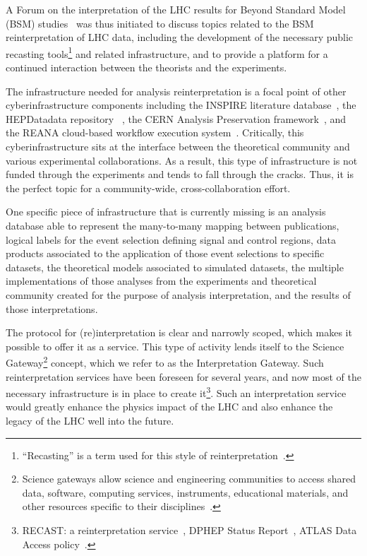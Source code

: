 \documentclass[12pt,a4paper]{article}
\begin{document}
A Forum on the interpretation of the LHC results for Beyond Standard Model (BSM) studies~\cite{LHCInterpretationForum} was thus initiated to discuss topics related to the BSM reinterpretation of LHC data, including the development of the necessary public recasting tools\footnote{``Recasting'' is a term used for this style of reinterpretation~\cite{Cranmer:1299950}.} and related infrastructure, and to provide a platform for a continued interaction between the theorists and the experiments. 

The infrastructure needed for analysis reinterpretation is a focal point of other cyberinfrastructure components including the INSPIRE literature database~\cite{INSPIRE}, the HEPDatadata repository~\cite{HEPDataRepo} , the CERN Analysis Preservation framework~\cite{CAP}, and the REANA cloud-based workflow execution system~\cite{REANA}. Critically, this cyberinfrastructure sits at the interface between the theoretical community and various experimental collaborations. As a result, this type of infrastructure is not funded through the experiments and tends to fall through the cracks. Thus, it is the perfect topic for a community-wide, cross-collaboration effort.

One specific piece of infrastructure that is currently missing is an analysis database able to represent the many-to-many mapping between publications, logical labels for the event selection defining signal and control regions, data products associated to the application of those event selections to specific datasets, the theoretical models associated to simulated datasets, the multiple implementations of those analyses from the experiments and theoretical community created for the purpose of analysis interpretation, and the results of those interpretations.

The protocol for (re)interpretation is clear and narrowly scoped, which makes it possible to offer it as a service. This type of activity lends itself to the Science Gateway\footnote{Science gateways allow science and engineering communities to access shared data, software, computing services, instruments, educational materials, and other resources specific to their disciplines~\cite{SciGateway}.} concept, which we refer to as the Interpretation Gateway. Such reinterpretation services have been foreseen for several years, and now most of the necessary infrastructure is in place to create it\footnote{RECAST: a reinterpretation service~\cite{Cranmer:1299950}, DPHEP Status Report~\cite{Akopov:2012bm}, ATLAS Data Access policy~\cite{ATL-CB-PUB-2015-001}.}. Such an interpretation service would greatly enhance the physics impact of the LHC and also enhance the legacy of the LHC well into the future.
\end{document}
